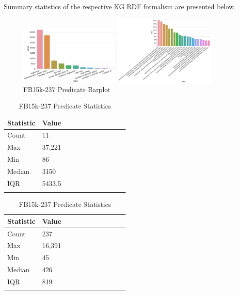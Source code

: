 
\noindent Summary statistics of the respective KG RDF formalism are presented below.

\begin{figure}[H]
	\parbox{.5\linewidth}{
   		\centering
    		\includegraphics[width=0.45\textwidth, height=0.2\textheight]{WN18RR_Predicate_Counts}
		\caption{WN18RR Predicate Barplot}
		}
	\hfill
	\parbox{.5\linewidth}{
   		\centering
		\includegraphics[width=0.45\textwidth, height=0.2\textheight]{FB15k-237_Predicate_Counts}
		\caption{FB15k-237 Predicate Barplot}
		}
\end{figure}

\begin{table}[H]
	\parbox{.5\linewidth}{
		\centering
		\begin{tabular}{lllllllllll}
  			\textbf{Statistic} & \textbf{Value}  \\
  			\hline
			Count & 11 \\
			Max & 37,221  \\
			Min & 86 \\
  			Median & 3150  \\
  			IQR & 5433.5  \\
			&
		\end{tabular}
		\caption{WN18RR Predicate Statistics}
		}
	\hfill
	\parbox{.5\linewidth}{
		\centering
		\begin{tabular}{lllllllllll}
  			\textbf{Statistic} & \textbf{Value}  \\
  			\hline
			Count & 237 \\
			Max & 16,391 \\
			Min & 45  \\
  			Median & 426  \\
  			IQR & 819 \\
			&
		\end{tabular}
		\caption{FB15k-237 Predicate Statistics}
		}
\end{table}


